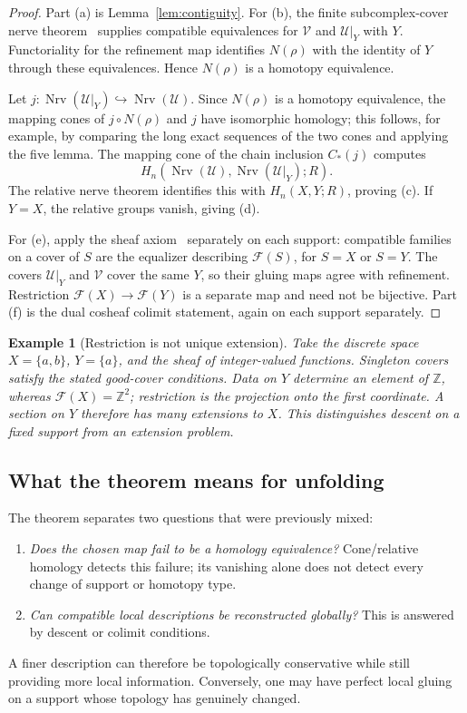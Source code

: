 \documentclass[11pt]{article}
\newtheorem{example}[theorem]{Example}
\newcommand{\Nrv}{\operatorname{Nrv}}
\begin{document}
\begin{proof}
Part (a) is Lemma~\ref{lem:contiguity}.  For (b), the finite
subcomplex-cover nerve theorem~\cite{BauerEtAl2023,Ramras2026}
supplies compatible equivalences for $\mathcal V$ and
$\mathcal U|_Y$ with $Y$.  Functoriality for the refinement map
identifies $N(\rho)$ with the identity of $Y$ through these
equivalences.  Hence $N(\rho)$ is a homotopy equivalence.

Let $j:\Nrv(\mathcal U|_Y)\hookrightarrow\Nrv(\mathcal U)$.  Since $N(\rho)$ is a homotopy equivalence, the mapping cones of $j\circ N(\rho)$ and $j$ have isomorphic homology; this follows, for example, by comparing the long exact sequences of the two cones and applying the five lemma.  The mapping cone of the chain inclusion $C_*(j)$ computes
\[
H_n(\Nrv(\mathcal U),\Nrv(\mathcal U|_Y);R).
\]
The relative nerve theorem identifies this with $H_n(X,Y;R)$, proving (c).  If $Y=X$, the relative groups vanish, giving (d).

For (e), apply the sheaf axiom~\cite{Curry2013} separately on each support: compatible
families on a cover of $S$ are the equalizer describing $\mathcal F(S)$,
for $S=X$ or $S=Y$.  The covers $\mathcal U|_Y$ and $\mathcal V$ cover
the same $Y$, so their gluing maps agree with refinement.  Restriction
$\mathcal F(X)\to\mathcal F(Y)$ is a separate map and need not be bijective.
Part (f) is the dual cosheaf colimit statement, again on each support separately.
\end{proof}

\begin{example}[Restriction is not unique extension]
Take the discrete space $X=\{a,b\}$, $Y=\{a\}$, and the sheaf of
integer-valued functions.  Singleton covers satisfy the stated good-cover
conditions.  Data on $Y$ determine an element of $\mathbb Z$, whereas
$\mathcal F(X)=\mathbb Z^2$; restriction is the projection onto the first
coordinate.  A section on $Y$ therefore has many extensions to $X$.
This distinguishes descent on a fixed support from an extension problem.
\end{example}

\subsection{What the theorem means for unfolding}
The theorem separates two questions that were previously mixed:
\begin{enumerate}[label=(\roman*)]
\item \emph{Does the chosen map fail to be a homology equivalence?}  Cone/relative homology detects this failure; its vanishing alone does not detect every change of support or homotopy type.
\item \emph{Can compatible local descriptions be reconstructed globally?}  This is answered by descent or colimit conditions.
\end{enumerate}
A finer description can therefore be topologically conservative while still providing more local information.  Conversely, one may have perfect local gluing on a support whose topology has genuinely changed.
\end{document}
